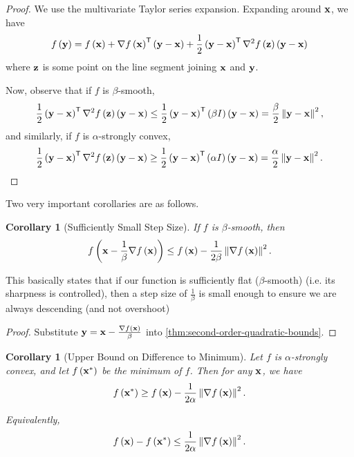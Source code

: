 \documentclass[11pt]{article}
\newtheorem{corollary}[theorem]{Corollary}
\theoremstyle{definition}
\theoremstyle{remark}
\newcommand{\pqty}[1]{\left(#1\right)}
\newcommand{\flatfrac}[2]{\frac{#1}{#2}}
\newcommand{\transpose}{^{\mathsf{T}}}
\newcommand{\grad}{\nabla}
\newcommand{\identityM}{I}
\begin{document}
\begin{proof}
    We use the multivariate Taylor series expansion. Expanding around \(\vb{x}\), we have
    \[
        f\pqty{\vb{y}} = f\pqty{\vb{x}} + \grad f\pqty{\vb{x}} \transpose \pqty{\vb{y} - \vb{x}} + \frac{1}{2} \pqty{\vb{y} - \vb{x}}\transpose \grad^2 f\pqty{\vb{z}} \pqty{\vb{y} - \vb{x}}
    \]
    where \(\vb{z}\) is some point on the line segment joining \(\vb{x}\) and \(\vb{y}\).

    Now, observe that if \(f\) is \(\beta\)-smooth,
    \[
        \frac{1}{2} \pqty{\vb{y} - \vb{x}}\transpose \grad^2 f\pqty{\vb{z}} \pqty{\vb{y} - \vb{x}} \leq \frac{1}{2} \pqty{\vb{y} - \vb{x}}\transpose \pqty{\beta \identityM} \pqty{\vb{y} - \vb{x}} = \frac{\beta}{2} \norm{\vb{y} - \vb{x}}^2,
    \]
    and similarly, if \(f\) is \(\alpha\)-strongly convex,
    \[
        \frac{1}{2} \pqty{\vb{y} - \vb{x}}\transpose \grad^2 f\pqty{\vb{z}} \pqty{\vb{y} - \vb{x}} \geq \frac{1}{2} \pqty{\vb{y} - \vb{x}}\transpose \pqty{\alpha \identityM} \pqty{\vb{y} - \vb{x}} = \frac{\alpha}{2} \norm{\vb{y} - \vb{x}}^2.
    \]
\end{proof}

Two very important corollaries are as follows.

\begin{corollary}[Sufficiently Small Step Size]\label{optim-unit-0014}
    \label{cor:grad-descent-beta-bound}%
    If \(f\) is \(\beta\)-smooth, then
    \[
        f\pqty{\vb{x} - \frac{1}{\beta} \grad f\pqty{\vb{x}}} \leq f\pqty{\vb{x}} - \frac{1}{2 \beta} \norm{\grad f\pqty{\vb{x}}}^2.
    \]
\end{corollary}

This basically states that if our function is sufficiently flat (\(\beta\)-smooth) (i.e. its sharpness is controlled), then a step size of \(\flatfrac{1}{\beta}\) is small enough to ensure we are always descending (and not overshoot)

\begin{proof}
    Substitute \(\vb{y} = \vb{x} - \flatfrac{\grad f\pqty{\vb{x}}}{\beta}\) into \autoref{thm:second-order-quadratic-bounds}.
\end{proof}

\begin{corollary}[Upper Bound on Difference to Minimum]\label{optim-unit-0015}
    \label{cor:grad-descent-alpha-bound}%
    Let \(f\) is \(\alpha\)-strongly convex, and let \(f\pqty{\vb{x}^{\ast}}\) be the minimum of \(f\). Then for any \(\vb{x}\), we have
    \[
        f\pqty{\vb{x}^{\ast}} \geq f\pqty{\vb{x}} - \frac{1}{2 \alpha} \norm{\grad f\pqty{\vb{x}}}^2.
    \]

    Equivalently,
    \[
        f\pqty{\vb{x}} - f\pqty{\vb{x}^{\ast}} \leq \frac{1}{2 \alpha} \norm{\grad f\pqty{\vb{x}}}^2.
    \]
\end{corollary}
\end{document}
